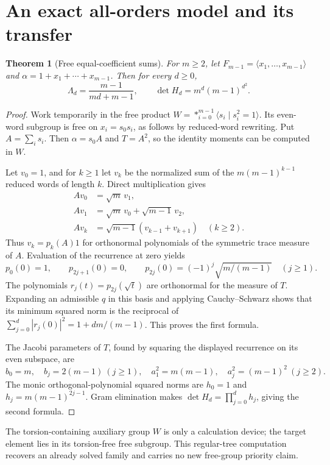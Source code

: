 \documentclass[11pt,a4paper,oneside]{report}
\newtheorem{theorem}{Theorem}[section]
\theoremstyle{definition}
\theoremstyle{remark}
\begin{document}
\section{An exact all-orders model and its transfer}\label{M03:sec:free}
\begin{theorem}[Free equal-coefficient sums]\label{M03:thm:free}
For \(m\ge2\), let \(F_{m-1}=\langle x_1,\ldots,x_{m-1}\rangle\) and \(\alpha=1+x_1+\cdots+x_{m-1}\). Then for every \(d\ge0\),
\begin{equation}\label{M03:eq:free}
\boxed{\Lambda_d=\frac{m-1}{md+m-1},\qquad
\det H_d=m^d(m-1)^{d^2}.}
\end{equation}
\end{theorem}
\begin{proof}
Work temporarily in the free product \(W=*_{i=0}^{m-1}\langle s_i\mid s_i^2=1\rangle\). Its even-word subgroup is free on \(x_i=s_0s_i\), as follows by reduced-word rewriting. Put \(A=\sum_i s_i\). Then \(\alpha=s_0A\) and \(T=A^2\), so the identity moments can be computed in \(W\).

Let \(v_0=1\), and for \(k\ge1\) let \(v_k\) be the normalized sum of the \(m(m-1)^{k-1}\) reduced words of length \(k\). Direct multiplication gives
\begin{align*}
Av_0&=\sqrt m\,v_1,\\
Av_1&=\sqrt m\,v_0+\sqrt{m-1}\,v_2,\\
Av_k&=\sqrt{m-1}(v_{k-1}+v_{k+1})\quad(k\ge2).
\end{align*}
Thus \(v_k=p_k(A)1\) for orthonormal polynomials of the symmetric trace measure of \(A\). Evaluation of the recurrence at zero yields
\[
p_0(0)=1,\qquad p_{2j+1}(0)=0,\qquad
p_{2j}(0)=(-1)^j\sqrt{m/(m-1)}\quad(j\ge1).
\]
The polynomials \(r_j(t)=p_{2j}(\sqrt t)\) are orthonormal for the measure of \(T\). Expanding an admissible \(q\) in this basis and applying Cauchy--Schwarz shows that its minimum squared norm is the reciprocal of
\(\sum_{j=0}^d|r_j(0)|^2=1+dm/(m-1)\). This proves the first formula.

The Jacobi parameters of \(T\), found by squaring the displayed recurrence on its even subspace, are
\[
b_0=m,\quad b_j=2(m-1)\ (j\ge1),\quad
a_1^2=m(m-1),\quad a_j^2=(m-1)^2\ (j\ge2).
\]
The monic orthogonal-polynomial squared norms are \(h_0=1\) and \(h_j=m(m-1)^{2j-1}\). Gram elimination makes \(\det H_d=\prod_{j=0}^d h_j\), giving the second formula.
\end{proof}
The torsion-containing auxiliary group \(W\) is only a calculation device; the target element lies in its torsion-free free subgroup. This regular-tree computation recovers an already solved family and carries no new free-group priority claim.
\end{document}
